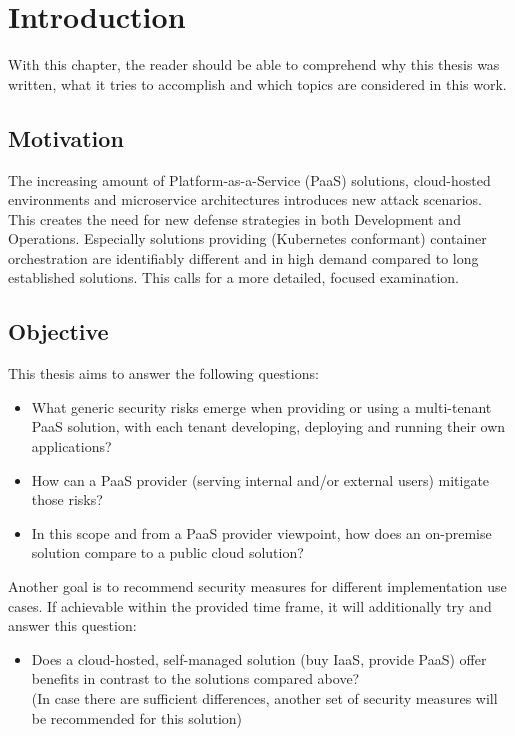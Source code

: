 \chapter{Introduction}
With this chapter, the reader should be able to comprehend why this thesis was written, what it tries to accomplish and which topics are considered in this work.

\section{Motivation}

The increasing amount of Platform-as-a-Service (PaaS) solutions, cloud-hosted environments and
microservice architectures introduces new attack scenarios. This creates the need for new defense
strategies in both Development and Operations. Especially solutions providing (Kubernetes
conformant) container orchestration are identifiably different and in high demand compared to long
established solutions. This calls for a more detailed, focused examination. \\

\section{Objective}


This thesis aims to answer the following questions:

\begin{itemize}

\item What generic security risks emerge when providing or using a multi-tenant PaaS solution,
with each tenant developing, deploying and running their own applications? 

\item How can a PaaS provider (serving internal and/or external users) mitigate those risks? 

\item  In this scope and from a PaaS provider viewpoint, how does an on-premise solution compare
to a public cloud solution? 

\end{itemize}

Another goal is to recommend security measures for different implementation use cases.
If achievable within the provided time frame, it will additionally try and answer this question: 

\begin{itemize}

\item Does a cloud-hosted, self-managed solution (buy IaaS, provide PaaS) offer benefits in
contrast to the solutions compared above? \\
(In case there are sufficient differences, another set of security measures will be
recommended for this solution)

\end{itemize}


